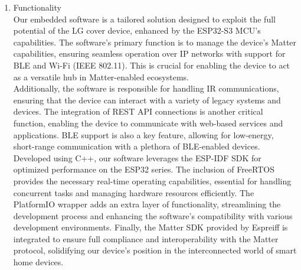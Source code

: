 \documentclass[conference]{IEEEtran}
\begin{document}
\begin{enumerate}[label=\arabic*.]
\item Functionality\\
Our embedded software is a tailored solution designed to exploit the full potential of the LG cover device, enhanced by the ESP32-S3 MCU's capabilities. The software's primary function is to manage the device's Matter capabilities, ensuring seamless operation over IP networks with support for BLE and Wi-Fi (IEEE 802.11). This is crucial for enabling the device to act as a versatile hub in Matter-enabled ecosystems.\\
Additionally, the software is responsible for handling IR communications, ensuring that the device can interact with a variety of legacy systems and devices. The integration of REST API connections is another critical function, enabling the device to communicate with web-based services and applications. BLE support is also a key feature, allowing for low-energy, short-range communication with a plethora of BLE-enabled devices.\\
Developed using C++, our software leverages the ESP-IDF SDK for optimized performance on the ESP32 series. The inclusion of FreeRTOS provides the necessary real-time operating capabilities, essential for handling concurrent tasks and managing hardware resources efficiently. The PlatformIO wrapper adds an extra layer of functionality, streamlining the development process and enhancing the software's compatibility with various development environments. Finally, the Matter SDK provided by Espreiff is integrated to ensure full compliance and interoperability with the Matter protocol, solidifying our device's position in the interconnected world of smart home devices.\\


\end{enumerate}
\end{document}
